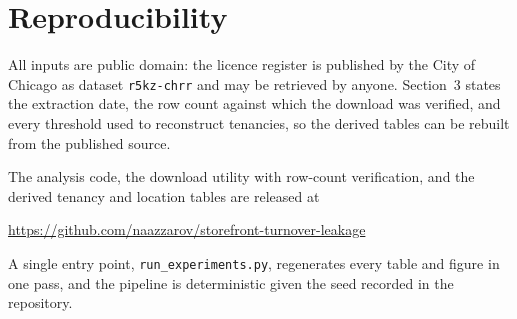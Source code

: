 \documentclass[11pt]{article}
\begin{document}
\section*{Reproducibility}

All inputs are public domain: the licence register is published by the City of
Chicago as dataset \texttt{r5kz-chrr} and may be retrieved by anyone. Section~3
states the extraction date, the row count against which the download was
verified, and every threshold used to reconstruct tenancies, so the derived
tables can be rebuilt from the published source.

The analysis code, the download utility with row-count verification, and the
derived tenancy and location tables are released at
\begin{center}
\url{https://github.com/naazzarov/storefront-turnover-leakage}
\end{center}
A single entry point, \texttt{run\_experiments.py}, regenerates every table and
figure in one pass, and the pipeline is deterministic given the seed recorded in
the repository.
\end{document}

